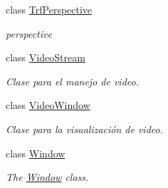 \begin{DoxyCompactItemize}
class \hyperlink{class_i3_d_1_1_trf_perspective}{Trf\+Perspective}
\begin{DoxyCompactList}\small\item\em perspective \end{DoxyCompactList}\item 
class \hyperlink{class_i3_d_1_1_video_stream}{Video\+Stream}
\begin{DoxyCompactList}\small\item\em Clase para el manejo de video. \end{DoxyCompactList}\item 
class \hyperlink{class_i3_d_1_1_video_window}{Video\+Window}
\begin{DoxyCompactList}\small\item\em Clase para la visualización de video. \end{DoxyCompactList}\item 
class \hyperlink{class_i3_d_1_1_window}{Window}
\begin{DoxyCompactList}\small\item\em The \hyperlink{class_i3_d_1_1_window}{Window} class. \end{DoxyCompactList}\end{DoxyCompactItemize}
